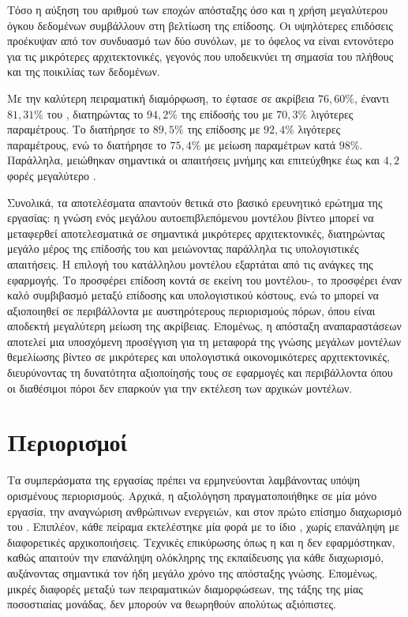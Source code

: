 Τόσο η αύξηση του αριθμού των εποχών απόσταξης όσο και η χρήση
μεγαλύτερου όγκου δεδομένων συμβάλλουν στη βελτίωση της επίδοσης. Οι υψηλότερες επιδόσεις προέκυψαν από τον συνδυασμό των
δύο συνόλων, με το όφελος να είναι εντονότερο για τις μικρότερες
αρχιτεκτονικές, γεγονός που υποδεικνύει τη σημασία του πλήθους και της
ποικιλίας των δεδομένων.

Με την καλύτερη πειραματική διαμόρφωση, το  έφτασε σε
ακρίβεια \(76{,}60\%\), έναντι \(81{,}31\%\) του
, διατηρώντας το \(94{,}2\%\) της επίδοσής του με
\(70{,}3\%\) λιγότερες παραμέτρους. Το  διατήρησε το
\(89{,}5\%\) της επίδοσης με \(92{,}4\%\) λιγότερες παραμέτρους, ενώ το
 διατήρησε το \(75{,}4\%\) με μείωση παραμέτρων κατά
\(98\%\). Παράλληλα, μειώθηκαν σημαντικά οι απαιτήσεις μνήμης και
επιτεύχθηκε έως και \(4{,}2\) φορές μεγαλύτερο .

Συνολικά, τα αποτελέσματα απαντούν θετικά στο βασικό ερευνητικό ερώτημα
της εργασίας: η γνώση ενός μεγάλου αυτοεπιβλεπόμενου μοντέλου βίντεο
μπορεί να μεταφερθεί αποτελεσματικά σε σημαντικά μικρότερες
αρχιτεκτονικές, διατηρώντας μεγάλο μέρος της επίδοσής του και μειώνοντας
παράλληλα τις υπολογιστικές απαιτήσεις. Η επιλογή του κατάλληλου
μοντέλου εξαρτάται από τις ανάγκες της εφαρμογής. Το
 προσφέρει επίδοση κοντά σε εκείνη του
μοντέλου-, το  προσφέρει έναν καλό συμβιβασμό μεταξύ επίδοσης και υπολογιστικού κόστους, ενώ το
 μπορεί να αξιοποιηθεί σε περιβάλλοντα με αυστηρότερους
περιορισμούς πόρων, όπου είναι αποδεκτή μεγαλύτερη μείωση της
ακρίβειας. Επομένως, η απόσταξη αναπαραστάσεων αποτελεί μια υποσχόμενη προσέγγιση
για τη μεταφορά της γνώσης μεγάλων μοντέλων θεμελίωσης βίντεο σε
μικρότερες και υπολογιστικά οικονομικότερες αρχιτεκτονικές,
διευρύνοντας τη δυνατότητα αξιοποίησής τους σε εφαρμογές και
περιβάλλοντα όπου οι διαθέσιμοι πόροι δεν επαρκούν για την εκτέλεση των
αρχικών μοντέλων.

\section{Περιορισμοί}
\label{sec:conclusions-limitations}

Τα συμπεράσματα της εργασίας πρέπει να ερμηνεύονται λαμβάνοντας υπόψη
ορισμένους περιορισμούς. Αρχικά, η αξιολόγηση πραγματοποιήθηκε σε μία μόνο
εργασία, την αναγνώριση ανθρώπινων ενεργειών, και στον πρώτο επίσημο
διαχωρισμό του . Επιπλέον, κάθε πείραμα εκτελέστηκε μία φορά με το ίδιο ,
χωρίς επανάληψη με διαφορετικές αρχικοποιήσεις. Τεχνικές επικύρωσης όπως
η  και η 
δεν εφαρμόστηκαν, καθώς απαιτούν την επανάληψη ολόκληρης της εκπαίδευσης
για κάθε διαχωρισμό, αυξάνοντας σημαντικά τον ήδη μεγάλο χρόνο της
απόσταξης γνώσης. Επομένως, μικρές
διαφορές μεταξύ των πειραματικών διαμορφώσεων, της τάξης της μίας
ποσοστιαίας μονάδας, δεν μπορούν να θεωρηθούν
απολύτως αξιόπιστες.


